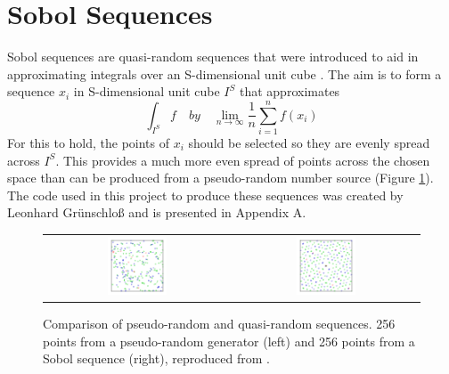 \section{Sobol Sequences}

Sobol sequences are quasi-random sequences that were introduced to aid in approximating integrals over an S-dimensional unit cube \cite{joe2008constructing}. The aim is to form a sequence $x_i$ in S-dimensional unit cube $I^S$ that approximates
\begin{equation}
    \int_{I^S} f \quad by \quad \lim_{n\to\infty}\frac{1}{n}\sum_{i=1}^{n} f(x_i)
\end{equation}
For this to hold, the points of $x_i$ should be selected so they are evenly spread across $I^S$. This provides a much more even spread of points across the chosen space than can be produced from a pseudo-random number source (Figure \ref{fig:Sobol}). The code used in this project to produce these sequences was created by Leonhard Gr\"unschlo\ss\space \cite{CodeSource} and is presented in Appendix A.

\begin{figure}[H]
    \begin{center}
    \begin{tabular}{ c c }
        \includegraphics[width=0.33\textwidth]{Figures/Pseudorandom_sequence_2D.png} &
        \includegraphics[width=0.33\textwidth]{Figures/Sobol_sequence_2D.png}
    \end{tabular}
    \caption[Comparison of pseudo-random and quasi-random sequences]{Comparison of pseudo-random and quasi-random sequences. 256 points from a pseudo-random generator (left) and 256 points from a Sobol sequence (right), reproduced from \cite{SobolWiki}.}
    \label{fig:Sobol}
    \end{center}
\end{figure}

